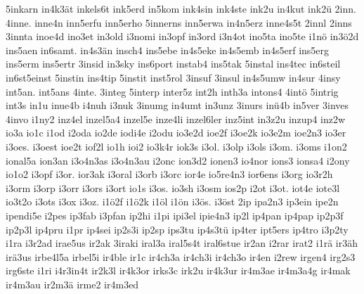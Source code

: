 {    5inkarn
    in4k3ät
    inkels6t
    ink5erd
    in5kom
    ink4sin
    ink4ste
    ink2u
    in4kut
    ink2ü
    2inn.
    4inne.
    inne4n
    inn5erfu
    inn5erho
    5innerns
    inn5erwa
    in4n5erz
    inne4s5t
    2innl
    2inns
    3innta
    inoe4d
    ino3et
    in3old
    i3nomi
    in3opf
    in3ord
    i3n4ot
    ino5ta
    ino5te
    i1nö
    in3ö2d
    ins5aen
    in6samt.
    in4s3än
    insch4
    ins5ebe
    in4s5eke
    in4s5emb
    in4s5erf
    ins5erg
    ins5erm
    ins5ertr
    3insid
    in3sky
    ins6port
    instab4
    ins5tak
    5instal
    ins4tec
    in6steil
    in6st5einst
    5instin
    ins4tip
    5instit
    inst5rol
    3insuf
    3insul
    in4s5umw
    in4sur
    4insy
    int5an.
    int5ans
    4inte.
    3integ
    5interp
    inter5z
    int2h
    inth3a
    intons4
    4intö
    5intrig
    int3s
    in1u
    inue4b
    i4nuh
    i3nuk
    3inumg
    in4umt
    in3unz
    3inurs
    inü4b
    in5ver
    3inves
    4invo
    i1ny2
    inz4el
    inzel5a4
    inzel5e
    inze4li
    inzel6ler
    inz5int
    in3z2u
    inzup4
    inz2w
    io3a
    io1c
    i1od
    i2oda
    io2de
    iodi4e
    i2odu
    io3e2d
    ioe2f
    i3oe2k
    io3e2m
    ioe2n3
    io3er
    i3oes.
    i3oest
    ioe2t
    iof2l
    io1h
    ioi2
    io3k4r
    iok3s
    i3ol.
    i3olp
    i3ols
    i3om.
    i3oms
    i1on2
    ional5a
    ion3an
    i3o4n3as
    i3o4n3au
    i2onc
    ion3d2
    ionen3
    io4nor
    ions3
    ionsa4
    i2ony
    io1o2
    i3opf
    i3or.
    ior3ak
    i3oral
    i3orb
    i3orc
    ior4e
    io5re4n3
    ior6ens
    i3org
    io3r2h
    i3orm
    i3orp
    i3orr
    i3ors
    i3ort
    io1s
    i3os.
    io3sh
    i3osm
    ios2p
    i2ot
    i3ot.
    iot4e
    iote3l
    io3t2o
    i3ots
    i3ox
    i3oz.
    i1ö2f
    i1ö2k
    i1öl
    i1ön
    i3ös.
    i3öst
    2ip
    ipa2n3
    ip3ein
    ipe2n
    ipendi5e
    i2pes
    ip3fab
    i3pfan
    ip2hi
    i1pi
    ipi3el
    ipie4n3
    ip2l
    ip4pan
    ip4pap
    ip2p3f
    ip2p3l
    ip4pru
    i1pr
    ip4sei
    ip2s3i
    ip2sp
    ips3tu
    ip4s3tü
    ip4ter
    ipt5ers
    ip4tro
    i3p2ty
    i1ra
    i3r2ad
    irae5us
    ir2ak
    3iraki
    iral3a
    iral5s4t
    iral6stue
    ir2an
    i2rar
    irat2
    i1rä
    ir3äh
    irä3us
    irbe4l5a
    irbel5i
    ir4ble
    ir1c
    ir4ch3a
    ir4ch3i
    ir4ch3o
    ir4en
    i2rew
    irgen4
    irg2s3
    irg6ste
    i1ri
    i4r3in4t
    ir2k3l
    ir4k3or
    irks3c
    irk2u
    ir4k3ur
    ir4m3ae
    ir4m3a4g
    ir4mak
    ir4m3au
    ir2m3ä
    irme2
    ir4m3ed
}
